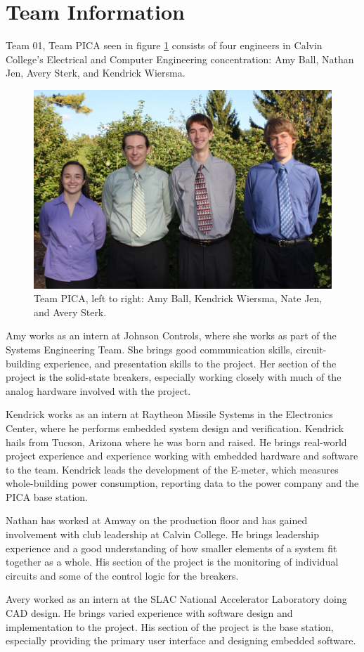\section{Team Information}

Team 01, Team PICA seen in figure \ref{fig:teamphoto} consists of four engineers in Calvin College's Electrical and Computer Engineering concentration: Amy Ball, Nathan Jen, Avery Sterk, and Kendrick Wiersma.

\begin{figure}[htbp]
\begin{center}
\includegraphics[width=6in]{figures/IMG_0865}
\caption{Team PICA, left to right: Amy Ball, Kendrick Wiersma, Nate Jen, and Avery Sterk.}
\label{fig:teamphoto}
\end{center}
\end{figure}

Amy works as an intern at Johnson Controls, where she works as part of the Systems Engineering Team. She brings good communication skills, circuit-building experience, and presentation skills to the project. Her section of the project is the solid-state breakers, especially working closely with much of the analog hardware involved with the project.

Kendrick works as an intern at Raytheon Missile Systems in the Electronics Center, where he performs embedded system design and verification. Kendrick hails from Tucson, Arizona where he was born and raised. He brings real-world project experience and experience working with embedded hardware and software to the team. Kendrick leads the development of the E-meter, which measures whole-building power consumption, reporting data to the power company and the PICA base station.

Nathan has worked at Amway on the production floor and has gained involvement with club leadership at Calvin College. He brings leadership experience and a good understanding of how smaller elements of a system fit together as a whole. His section of the project is the monitoring of individual circuits and some of the control logic for the breakers.

Avery worked as an intern at the SLAC National Accelerator Laboratory doing \ac{CAD} design. He brings varied experience with software design and implementation to the project. His section of the project is the base station, especially providing the primary user interface and designing embedded software.

